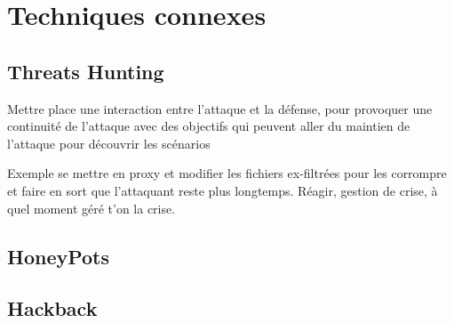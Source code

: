 %
%



\section{Techniques connexes}

\subsection{Threats Hunting}

Mettre place une interaction entre l'attaque et la défense, pour provoquer une continuité de l'attaque avec des objectifs qui peuvent aller du maintien de l'attaque pour découvrir les scénarios

Exemple se mettre en proxy et modifier les fichiers ex-filtrées pour les corrompre et faire en sort que l'attaquant reste plus longtemps.
Réagir, gestion de crise, à quel moment géré t’on la crise.

\subsection{HoneyPots}

\subsection{Hackback}


